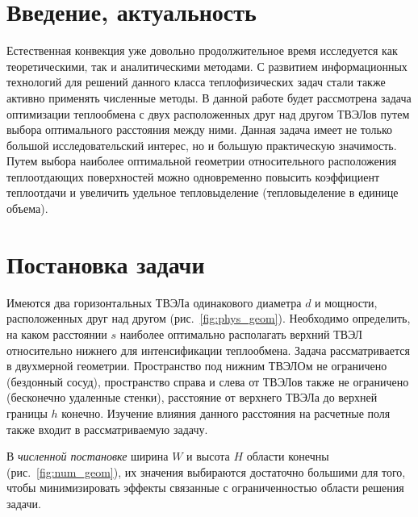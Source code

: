 



\newpage
\section{Введение, актуальность}
Естественная конвекция уже довольно продолжительное время исследуется как теоретическими, так и аналитическими методами. С развитием информационных технологий для решений данного класса теплофизических задач стали также активно применять численные методы. В данной работе будет рассмотрена задача оптимизации теплообмена с двух расположенных друг над другом ТВЭЛов путем выбора оптимального расстояния между ними. Данная задача имеет не только большой исследовательский интерес, но и большую практическую значимость. Путем выбора наиболее оптимальной геометрии относительного расположения теплоотдающих поверхностей можно одновременно повысить коэффициент теплоотдачи и увеличить удельное тепловыделение (тепловыделение в единице объема).

\section{Постановка задачи}
Имеются два горизонтальных ТВЭЛа одинакового диаметра $d$ и мощности, расположенных друг над другом (рис.~\ref{fig:phys_geom}). Необходимо определить, на каком расстоянии $s$ наиболее оптимально располагать верхний ТВЭЛ относительно нижнего для интенсификации теплообмена. Задача рассматривается в двухмерной геометрии. Пространство под нижним ТВЭЛОм не ограничено (бездонный сосуд), пространство справа и слева от ТВЭЛов также не ограничено (бесконечно удаленные стенки), расстояние от верхнего ТВЭЛа до верхней границы $h$ конечно. Изучение влияния данного расстояния на расчетные поля также входит в рассматриваемую задачу.

В \emph{численной постановке} ширина $W$ и высота $H$ области конечны (рис.~\ref{fig:num_geom}), их значения выбираются достаточно большими для того, чтобы минимизировать эффекты связанные с ограниченностью области решения задачи.


